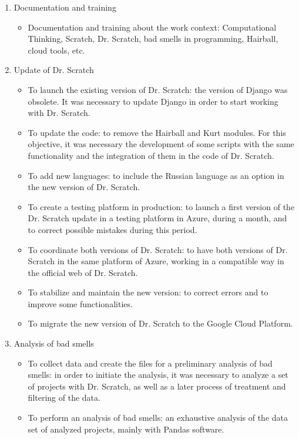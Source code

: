 \begin{enumerate}
    \item Documentation and training
    \begin{itemize}
        \item Documentation and training about the work context: Computational Thinking, Scratch, Dr. Scratch, bad smells in programming, Hairball, cloud tools, etc.
    \end{itemize}
    \item Update of Dr. Scratch
    \begin{itemize}
        \item To launch the existing version of Dr. Scratch: the version of Django was obsolete. It was necessary to update Django in order to start working with Dr. Scratch. 
        \item To update the code: to remove the Hairball and Kurt modules. For this objective, it was necessary the development of some scripts with the same functionality and the integration of them in the code of Dr. Scratch.
        \item To add new languages: to include the Russian language as an option in the new version of Dr. Scratch.
        \item To create a testing platform in production: to launch a first version of the Dr. Scratch update in a testing platform in Azure, during a month, and to correct possible mistakes during this period.
        \item To coordinate both versions of Dr. Scratch: to have both versions of Dr. Scratch in the same platform of Azure, working in a compatible way in the official web of Dr. Scratch.
        \item To stabilize and maintain the new version: to correct errors and to improve some functionalities.
        \item To migrate the new version of Dr. Scratch to the Google Cloud Platform.
    \end{itemize}
    \item Analysis of bad smells
    \begin{itemize}
        \item To collect data and create the files for a preliminary analysis of bad smells: in order to initiate the analysis, it was necessary to analyze a set of projects with Dr. Scratch, as well as a later process of treatment and filtering of the data.
        \item To perform an analysis of bad smells: an exhaustive analysis of the data set of analyzed projects, mainly with Pandas software. 

\end{itemize}
\end{enumerate}
